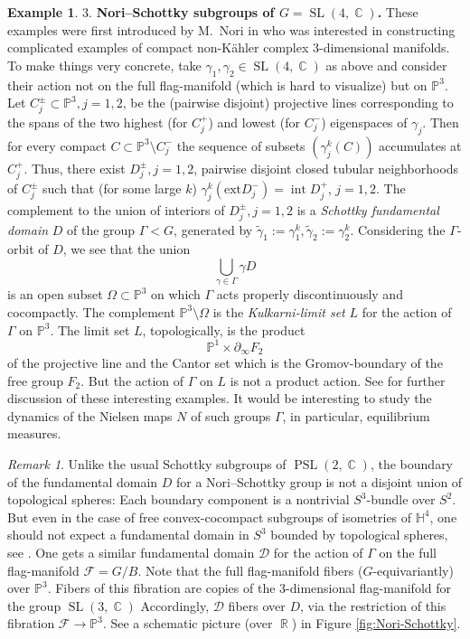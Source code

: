 \documentclass[12pt]{amsbook}%
\theoremstyle{definition}
\newtheorem{example}[thm]{Example}
\theoremstyle{remark}
\newtheorem{rem}[thm]{Remark}
\numberwithin{section}{chapter}
\numberwithin{subsection}{section}
\numberwithin{figure}{chapter}
\DeclareMathOperator{\C}{\mathbb{C}}
\DeclareMathOperator{\SL}{SL}
\DeclareMathOperator{\PSL}{PSL}
\DeclareMathOperator{\R}{\mathbb{R}}
\def\P{{\mathbb{P}}}
\def\bH{{\mathbb{H}}}
\def\cD{{\mathscr{D}}}
\def\cF{{\mathscr{F}}}
\def\Ga{\Gamma}
\def\ga{\gamma}
\def\Om{\Omega}
\def\geo{\partial_\infty}
\def\inte{\operatorname{int}}
\begin{document}
{{\begin{example}
{3. {\bf Nori--Schottky subgroups of $G=\SL(4,\C)$.} These examples were first introduced by M.~Nori in \cite{Nori} 
who was interested in constructing complicated examples 
of compact non-K\"ahler complex 3-dimensional manifolds. 
To make things very concrete, take $\ga_1, \ga_2\in \SL(4,\C)$ as above and consider their action not on the full 
flag-manifold (which is hard to visualize) but on $\P^3$. Let $C^\pm_j\subset  \P^3, j=1,2$, be the (pairwise 
disjoint) projective lines corresponding to the spans of the two highest (for $C_j^+$) and lowest (for $C_j^-$) eigenspaces of $\ga_j$. Then
for every compact $C\subset \P^3\setminus C_j^-$  the sequence of subsets $(\ga_j^k(C))$ accumulates at $C_j^+$. Thus, there exist 
$D_j^\pm, j=1,2$,  pairwise disjoint closed tubular  neighborhoods of  $C_j^\pm$ such that (for some large $k$) $\ga_j^k(\mathrm{ext} D_j^-)= \inte D_j^+$, $j=1,2$. 
The complement to the union of interiors of $D_j^\pm, j=1,2$ is a {\em Schottky fundamental domain} $D$ of the group $\Ga< G$, generated by $\tilde{\ga}_1:=\ga_1^k, \tilde{\gamma}_2:=\ga_2^k$. 
Considering the  $\Ga$-orbit of $D$, we see that the union  
$$
\bigcup_{\ga\in\Ga} \ga D
$$
is an open subset $\Om\subset \P^3$ on which $\Ga$ acts properly discontinuously and cocompactly. 
The complement $\P^3\setminus \Om$ is the {\em Kulkarni-limit set} $L$ for the action of $\Ga$ on $\P^3$. The limit set $L$, topologically, is the product
$$
\P^1\times \geo F_2
$$ 
of the projective line and the Cantor set which is the Gromov-boundary of the free group $F_2$. But the action of $\Ga$ on $L$ is not a product action. 
See \cite{CNS} for further discussion of these interesting examples. 
It would be interesting to study the dynamics of the Nielsen maps $N$ of such groups $\Ga$, 
in particular, equilibrium measures.  
}
\end{example}

\begin{rem}
Unlike the usual Schottky subgroups of $\PSL(2,\C)$, the boundary of the fundamental domain $D$ for a 
Nori--Schottky group  is not a disjoint union of topological spheres: Each boundary component is a nontrivial 
$S^3$-bundle over $S^2$. But even in the case of free convex-cocompact subgroups of isometries of $\bH^4$, one should not expect  a fundamental domain in $S^3$ bounded by topological spheres, see \cite{BC, Matsumoto}. One gets a similar fundamental domain $\cD$ for the action of $\Ga$ on the full flag-manifold $\cF=G/B$. Note that 
the full flag-manifold fibers ($G$-equivariantly) over $\P^3$. Fibers of this fibration are copies of the 3-dimensional flag-manifold for the group $\SL(3,\C)$ 
Accordingly,  $\cD$ fibers over $D$,  via the restriction of this fibration $\cF\to \P^3$. See a schematic picture (over $\R$) in Figure \ref{fig:Nori-Schottky}. 
\end{rem}

}}
\end{document}
